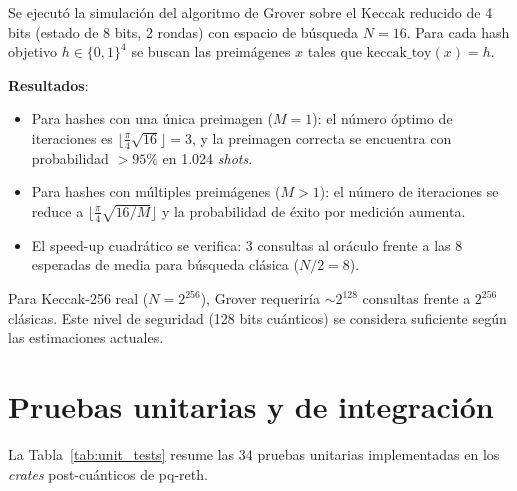 Se ejecutó la simulación del algoritmo de Grover sobre el Keccak reducido de 4 bits (estado de 8 bits, 2 rondas) con espacio de búsqueda $N = 16$. Para cada hash objetivo $h \in \{0, 1\}^4$ se buscan las preimágenes $x$ tales que $\text{keccak\_toy}(x) = h$.

\textbf{Resultados}:
\begin{itemize}
  \item Para hashes con una única preimagen ($M = 1$): el número óptimo de iteraciones es $\lfloor \frac{\pi}{4}\sqrt{16} \rfloor = 3$, y la preimagen correcta se encuentra con probabilidad $> 95\%$ en 1.024 \emph{shots}.
  \item Para hashes con múltiples preimágenes ($M > 1$): el número de iteraciones se reduce a $\lfloor \frac{\pi}{4}\sqrt{16/M} \rfloor$ y la probabilidad de éxito por medición aumenta.
  \item El speed-up cuadrático se verifica: 3 consultas al oráculo frente a las 8 esperadas de media para búsqueda clásica ($N/2 = 8$).
\end{itemize}

Para Keccak-256 real ($N = 2^{256}$), Grover requeriría $\sim 2^{128}$ consultas frente a $2^{256}$ clásicas. Este nivel de seguridad (128 bits cuánticos) se considera suficiente según las estimaciones actuales.


\section{Pruebas unitarias y de integración}
\label{sec:res_unit}

La Tabla~\ref{tab:unit_tests} resume las 34 pruebas unitarias implementadas en los \emph{crates} post-cuánticos de pq-reth.

